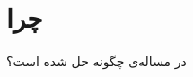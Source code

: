 \documentclass[../main.tex]{subfiles}
\begin{document}
\section{چرا }

\paragraph{}
در  مساله‌ی  چگونه حل شده است؟
\end{document}

